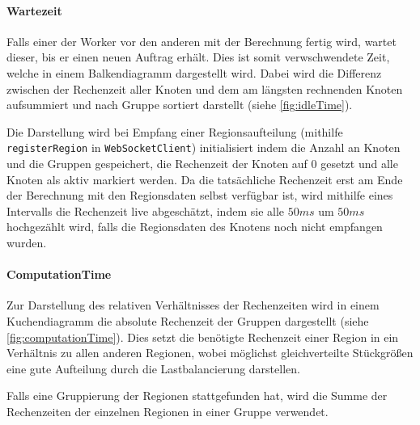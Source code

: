 \paragraph{Wartezeit}
Falls einer der Worker vor den anderen mit der Berechnung fertig wird, wartet dieser,
bis er einen neuen Auftrag erhält. Dies ist somit verwschwendete Zeit, welche in einem Balkendiagramm dargestellt wird.
Dabei wird die Differenz zwischen der Rechenzeit aller Knoten und dem am längsten rechnenden Knoten
aufsummiert und nach Gruppe sortiert darstellt (siehe \autoref{fig:idleTime}).

Die Darstellung wird bei Empfang einer Regionsaufteilung (mithilfe \verb|registerRegion| in \verb|WebSocketClient|)
initialisiert indem die Anzahl an Knoten und die Gruppen gespeichert, die Rechenzeit der Knoten auf \( 0 \) gesetzt und
alle Knoten als aktiv markiert werden.
Da die tatsächliche Rechenzeit erst am Ende der Berechnung mit den Regionsdaten selbst verfügbar ist,
wird mithilfe eines Intervalls die Rechenzeit live abgeschätzt, indem sie alle \( 50ms \) um
\( 50ms \) hochgezählt wird, falls die Regionsdaten des Knotens noch nicht empfangen wurden.

\paragraph{ComputationTime}
Zur Darstellung des relativen Verhältnisses der Rechenzeiten wird in einem Kuchendiagramm
die absolute Rechenzeit der Gruppen dargestellt (siehe \autoref{fig:computationTime}).
Dies setzt die benötigte Rechenzeit einer Region in ein Verhältnis zu allen anderen Regionen,
wobei möglichst gleichverteilte Stückgrößen eine gute Aufteilung durch die Lastbalancierung darstellen.

Falls eine Gruppierung der Regionen stattgefunden hat, wird die Summe der Rechenzeiten der einzelnen Regionen 
in einer Gruppe verwendet.
